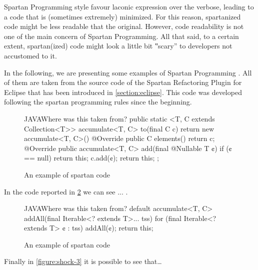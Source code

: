 Spartan Programming style favour laconic expression over the verbose, leading
to a code that is (sometimes extremely) minimized. For this reason, spartanized
code might be less readable that the original. However, code readability is not
one of the main concern of Spartan Programming. All that said, to a certain
extent, spartan(ized) code might look a little bit ‟scary” to developers not
accustomed to it.

In the following, we are presenting some examples of Spartan
Programming %
.
All of them are taken from the source code of the Spartan Refactoring Plugin
for Eclipse that has been introduced in \cref{section:eclipse}. This code was
developed following the spartan programming rules since the beginning.


\begin{figure}
\label{figure:first}
\caption{An example of spartan code}
\begin{Code}{JAVA}{Where was this taken from?}
public static <T, C extends Collection<T>> accumulate<T, C>
to(final C c) {
return new accumulate<T, C>() {
@Override public C elements() {
return c;
}
@Override public accumulate<T, C>
add(final @Nullable T ¢) {
if (¢ == null)
return this;
c.add(¢);
return this;
}
};
}
\end{Code}
\end{figure}

In the code reported in \cref{figure:shock-2} we can see ... .

\begin{figure}
\label{figure:shock-2}
\caption{An example of spartan code}
\begin{Code}{JAVA}{Where was this taken from?}
default accumulate<T, C>
addAll(final Iterable<? extends T>... tss) {
for (final Iterable<? extends T> ¢ : tss)
addAll(¢);
return this;
}
\end{Code}

\end{figure}
Finally in \cref{figure:shock-3} it is possible to see that…


